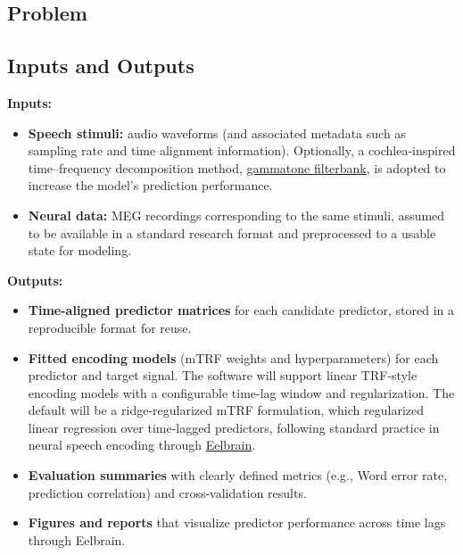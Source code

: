 \documentclass{article}
\begin{document}
\subsection{Problem}

\subsection{Inputs and Outputs}


\noindent \textbf{Inputs:}
\begin{itemize}
  \item \textbf{Speech stimuli:} audio waveforms (and associated metadata such as
  sampling rate and time alignment information). Optionally, a cochlea-inspired time--frequency decomposition method, \href{https://en.wikipedia.org/wiki/Gammatone_filter}{gammatone filterbank}, is adopted to increase the model's prediction performance.

  \item \textbf{Neural data:} MEG recordings corresponding to the same stimuli,
  assumed to be available in a standard research format and preprocessed to a
  usable state for modeling.
\end{itemize}

\noindent \textbf{Outputs:}
\begin{itemize}
  \item \textbf{Time-aligned predictor matrices} for each candidate predictor,
  stored in a reproducible format for reuse.
  \item \textbf{Fitted encoding models} (mTRF weights and hyperparameters) for
  each predictor and target signal. The software will support linear TRF-style encoding models with a configurable time-lag window and regularization. The default will be a ridge-regularized mTRF formulation, which regularized linear regression over time-lagged predictors, following standard practice in neural speech encoding through \href{https://eelbrain.readthedocs.io/en/stable/auto_examples/temporal-response-functions/alice-trf.html#sphx-glr-auto-examples-temporal-response-functions-alice-trf-py}{Eelbrain}.
  \item \textbf{Evaluation summaries} with clearly defined metrics (e.g., Word error rate, prediction correlation) and cross-validation results.
  \item \textbf{Figures and reports} that visualize predictor performance across
  time lags through Eelbrain.
\end{itemize}
\end{document}

